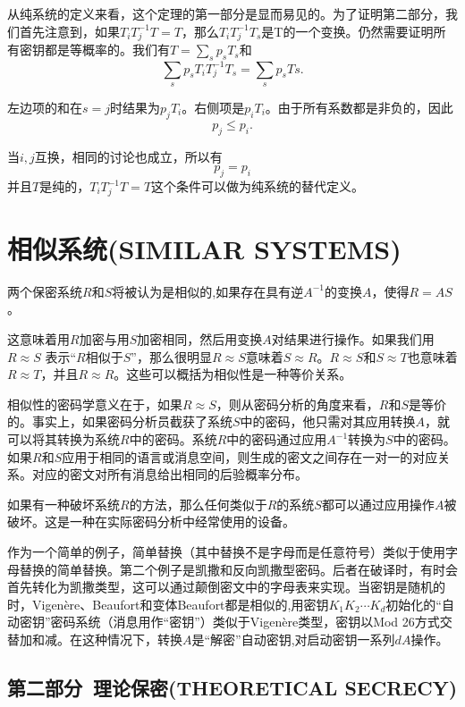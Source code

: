 \documentclass[]{article}
\begin{document}
从纯系统的定义来看，这个定理的第一部分是显而易见的。为了证明第二部分，我们首先注意到，如果$T_i T^{-1}_j T= T$，那么$T_i T^{-1}_j T_s$是T的一个变换。仍然需要证明所有密钥都是等概率的。我们有$T=\sum_{s}p_sT_s$和
\[\sum_{s} p_sT_iT^{-1}_jT_s = \sum_{s}p_sTs.\]

左边项的和在$s=j$时结果为$p_jT_i$。右侧项是$p_iT_i$。由于所有系数都是非负的，因此
\[p_j\leq p_i.\]

当$i,j$互换，相同的讨论也成立，所以有
\[p_j = p_i\]
并且$T$是纯的，$T_iT^{-1}_jT=T$这个条件可以做为纯系统的替代定义。

\section{相似系统(SIMILAR SYSTEMS)}

两个保密系统$R$和$S$将被认为是相似的,如果存在具有逆$A^{-1}$的变换$A$，使得$R=AS$。

这意味着用$R$加密与用$S$加密相同，然后用变换$A$对结果进行操作。如果我们用$R\approx S$ 表示“$R$相似于$S$”，那么很明显$R\approx S$意味着$S\approx R$。$R\approx S$和$S\approx T$也意味着$R\approx T$，并且$R\approx R$。这些可以概括为相似性是一种等价关系。

相似性的密码学意义在于，如果$R\approx S$，则从密码分析的角度来看，$R$和$S$是等价的。事实上，如果密码分析员截获了系统$S$中的密码，他只需对其应用转换$A$，就可以将其转换为系统$R$中的密码。系统$R$中的密码通过应用$A^{-1}$转换为$S$中的密码。如果$R$和$S$应用于相同的语言或消息空间，则生成的密文之间存在一对一的对应关系。对应的密文对所有消息给出相同的后验概率分布。

如果有一种破坏系统$R$的方法，那么任何类似于$R$的系统$S$都可以通过应用操作$A$被破坏。这是一种在实际密码分析中经常使用的设备。

作为一个简单的例子，简单替换（其中替换不是字母而是任意符号）类似于使用字母替换的简单替换。第二个例子是凯撒和反向凯撒型密码。后者在破译时，有时会首先转化为凯撒类型，这可以通过颠倒密文中的字母表来实现。当密钥是随机的时，Vigen\`{e}re、Beaufort和变体Beaufort都是相似的,用密钥$K_1 K_2\cdots K_d$初始化的“自动密钥”密码系统（消息用作“密钥”）类似于Vigen\`{e}re类型，密钥以Mod 26方式交替加和减。在这种情况下，转换$A$是“解密”自动密钥,对启动密钥一系列$d A$操作。

\begin{center}
	\section*{第二部分\ 理论保密(THEORETICAL SECRECY)}
\end{center}
\end{document}
